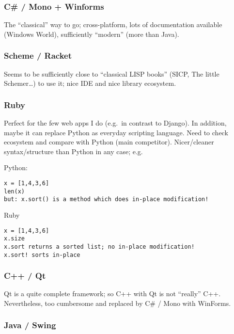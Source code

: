 \subsubsection{C\# / Mono + Winforms}\label{c-mono-winforms}

The ``classical'' way to go; cross-platform, lots of documentation available (Windows World), sufficiently ``modern'' (more than Java).

\subsubsection{Scheme / Racket}\label{scheme-racket}

Seems to be sufficiently close to ``classical LISP books'' (SICP, The little Schemer\ldots{}) to use it; nice IDE and nice library ecosystem.

\subsubsection{Ruby}\label{ruby}

Perfect for the few web apps I do (e.g.~in contrast to Django). In addition, maybe it can replace Python as everyday scripting language. Need to check ecosystem and compare with Python (main competitor). Nicer/cleaner syntax/structure than Python in any case; e.g.

Python:

\begin{verbatim}
x = [1,4,3,6]
len(x)
but: x.sort() is a method which does in-place modification!
\end{verbatim}

Ruby

\begin{verbatim}
x = [1,4,3,6]
x.size
x.sort returns a sorted list; no in-place modification!
x.sort! sorts in-place
\end{verbatim}

\subsubsection{C++ / Qt}\label{c-qt}

Qt is a quite complete framework; so C++ with Qt is not ``really'' C++. Nevertheless, too cumbersome and replaced by C\# / Mono with WinForms.

\subsubsection{Java / Swing}\label{java-swing}

